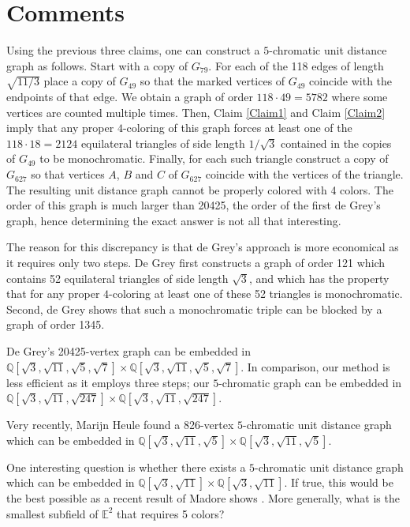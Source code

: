 \documentclass [11pt,oneside]{amsart}
\theoremstyle{definition}
\theoremstyle{plain}
\begin{document}
\section{\bf Comments}

Using the previous three claims, one can construct a $5$-chromatic unit distance graph as follows.
Start with a copy of $G_{79}$. For each of the 118 edges of length $\sqrt{11/3}$ place a copy of $G_{49}$ so that the
marked vertices of $G_{49}$ coincide with the endpoints of that edge. We obtain a graph of order $118\cdot 49=5782$ where some
vertices are counted multiple times. Then, Claim \ref{Claim1} and Claim \ref{Claim2} imply that any proper $4$-coloring of this graph
forces at least one of the $118\cdot 18=2124$ equilateral triangles of side length $1/\sqrt{3}$ contained in the copies of $G_{49}$ to be
monochromatic. Finally, for each such triangle construct a copy of $G_{627}$ so that vertices $A$, $B$ and $C$ of $G_{627}$ coincide
with the vertices of the triangle.  The resulting unit distance graph cannot be properly colored with 4 colors.
The order of this graph is much larger than 20425, the order of the first de Grey's graph, hence determining the exact answer is not all that interesting.

The reason for this discrepancy is that de Grey's approach is more economical as it requires only two steps. De Grey first constructs
a graph of order 121 which contains 52 equilateral triangles of side length $\sqrt{3}$, and which has the property that for any proper $4$-coloring
at least one of these 52 triangles is monochromatic. Second, de Grey shows that such a monochromatic triple can be blocked by a graph of order 1345.

De Grey's 20425-vertex graph can be embedded in $\mathbb{Q}[\sqrt{3},\sqrt{11},\sqrt{5},\sqrt{7}]\times \mathbb{Q}[\sqrt{3},\sqrt{11},\sqrt{5},\sqrt{7}]$.
In comparison, our method is less efficient as it employs three steps; our $5$-chromatic graph can be embedded in
$\mathbb{Q}[\sqrt{3}, \sqrt{11},\sqrt{247}]\times \mathbb{Q}[\sqrt{3}, \sqrt{11},\sqrt{247}]$.

Very recently, Marijn Heule \cite{mixon} found a 826-vertex $5$-chromatic unit distance graph which can be embedded in $\mathbb{Q}[\sqrt{3},\sqrt{11},\sqrt{5}]\times \mathbb{Q}[\sqrt{3},\sqrt{11},\sqrt{5}]$.

One interesting question is whether there exists a $5$-chromatic unit distance graph which can be embedded in
$\mathbb{Q}[\sqrt{3},\sqrt{11}]\times \mathbb{Q}[\sqrt{3},\sqrt{11}]$. If true, this would be the best possible as a recent result of Madore shows \cite{madore}.
More generally, what is the smallest subfield of $\mathbb{E}^2$ that requires 5 colors?
\end{document}
